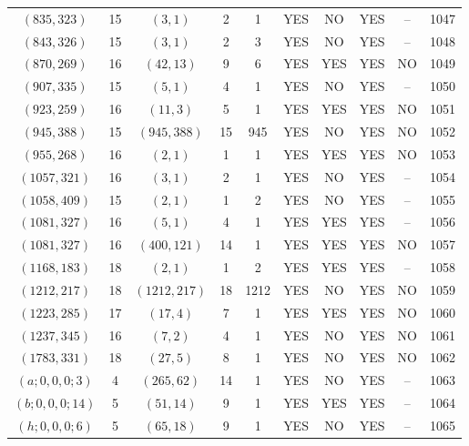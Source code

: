 \begin{longtable}{|c|c|c|c|c|c|c|c|c|c|}
$(835, 323)$ & 15 & $(3, 1)$ & 2 & 1 & YES & NO & YES & -- & 1047\\
$(843, 326)$ & 15 & $(3, 1)$ & 2 & 3 & YES & NO & YES & -- & 1048\\
$(870, 269)$ & 16 & $(42, 13)$ & 9 & 6 & YES & YES & YES & NO & 1049\\
$(907, 335)$ & 15 & $(5, 1)$ & 4 & 1 & YES & NO & YES & -- & 1050\\
$(923, 259)$ & 16 & $(11, 3)$ & 5 & 1 & YES & YES & YES & NO & 1051\\
$(945, 388)$ & 15 & $(945, 388)$ & 15 & 945 & YES & NO & YES & NO & 1052\\
$(955, 268)$ & 16 & $(2, 1)$ & 1 & 1 & YES & YES & YES & NO & 1053\\
$(1057, 321)$ & 16 & $(3, 1)$ & 2 & 1 & YES & NO & YES & -- & 1054\\
$(1058, 409)$ & 15 & $(2, 1)$ & 1 & 2 & YES & NO & YES & -- & 1055\\
$(1081, 327)$ & 16 & $(5, 1)$ & 4 & 1 & YES & YES & YES & -- & 1056\\
$(1081, 327)$ & 16 & $(400, 121)$ & 14 & 1 & YES & YES & YES & NO & 1057\\
$(1168, 183)$ & 18 & $(2, 1)$ & 1 & 2 & YES & YES & YES & -- & 1058\\
$(1212, 217)$ & 18 & $(1212, 217)$ & 18 & 1212 & YES & NO & YES & NO & 1059\\
$(1223, 285)$ & 17 & $(17, 4)$ & 7 & 1 & YES & YES & YES & NO & 1060\\
$(1237, 345)$ & 16 & $(7, 2)$ & 4 & 1 & YES & NO & YES & NO & 1061\\
$(1783, 331)$ & 18 & $(27, 5)$ & 8 & 1 & YES & NO & YES & NO & 1062\\
$(a; 0, 0, 0; 3)$ & 4 & $(265, 62)$ & 14 & 1 & YES & NO & YES & -- & 1063\\
$(b; 0, 0, 0; 14)$ & 5 & $(51, 14)$ & 9 & 1 & YES & YES & YES & -- & 1064\\
$(h; 0, 0, 0; 6)$ & 5 & $(65, 18)$ & 9 & 1 & YES & NO & YES & -- & 1065
\end{longtable}
